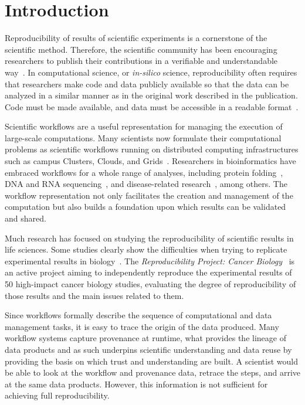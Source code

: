 \section{Introduction}

Reproducibility of results of scientific experiments is a cornerstone of the scientific 
method. Therefore, the scientific community has been encouraging researchers 
to publish their contributions in a verifiable and understandable 
way~\cite{YaleRoundtable09, James-XSEDE-2014}. In computational science, 
or \emph{in-silico} science, reproducibility often requires that researchers make 
code and data publicly available so that the data can be analyzed in a similar 
manner as in the original work described in the publication. Code must be made available, 
and data must be accessible in a readable format~\cite{bookReproducibility}. 

Scientific workflows are a useful representation for managing the execution of large-scale 
computations. Many scientists now formulate their computational problems as scientific 
workflows running on distributed computing infrastructures such as campus Clusters, 
Clouds, and Grids~\cite{workflowBook}. Researchers in bioinformatics have 
embraced workflows for a whole range of analyses, including protein folding~\cite{craddock2006science}, 
DNA and RNA sequencing~\cite{blankenberg2010galaxy, giardine2005galaxy}, 
and disease-related research~\cite{fisher2009systematic, gaizauskas2004}, among others.
The workflow representation not only facilitates the creation and management of the 
computation but also builds a foundation upon which results can be validated and 
shared. 

Much research has focused on studying the reproducibility of scientific results 
in life sciences. Some studies clearly show the difficulties when trying to replicate 
experimental results in biology~\cite{Ioannidis2009}. The \emph{Reproducibility 
Project: Cancer Biology}~\cite{ErringtonCancerRerpoducibility} is an active project 
aiming to independently reproduce the experimental results of 50 high-impact cancer 
biology studies, evaluating the degree of reproducibility of those results and the main 
issues related to them.


Since workflows formally describe the sequence of computational and data 
management tasks, it is easy to trace the origin of the data produced. Many workflow 
systems capture provenance at runtime, what provides the lineage of data products 
and as such underpins scientific understanding and data reuse by providing the basis on which 
trust and understanding are built. A scientist would be able to look at the workflow and 
provenance data, retrace the steps, and arrive at the same data products. 
However, this information is not sufficient for achieving full reproducibility.

